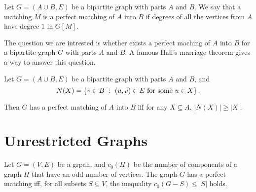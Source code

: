 \begin{definition}
  Let $G = (A \cup B, E)$ be a bipartite graph with parts $A$ and $B$. We
  say that a matching $M$ is a perfect matching of $A$ into $B$ if
  degrees of all the vertices from $A$ have degree $1$ in $G[M]$.
\end{definition}

The question we are intrested is whether exists a perfect maching of $A$ into
$B$ for a bipartite graph $G$ with parts $A$ and $B$. A famous Hall's marriage
theorem gives a way to answer this question.
\begin{theorem}
  Let $G = (A \cup B, E)$ be a bipartite graph with parts $A$ and $B$,
  and
  \[
    N(X) = \set[{(u, v) \in E \text{ for some } u \in X}]{v \in B}.
  \]

  Then $G$ has a perfect matching of $A$ into $B$ iff for any $X \subseteq A$,
  $|N(X)| \ge |X|$.
\end{theorem}


\section{Unrestricted Graphs}

\begin{theorem}
  Let $G = (V, E)$ be a grpah, and $c_0(H)$ be the number of components of a
  graph $H$ that have an odd number of vertices.
  The graph $G$ has a perfect matching iff, for all subsets
  $S \subseteq V$, the inequality $c_0(G - S) \le |S|$ holds.
\end{theorem}

